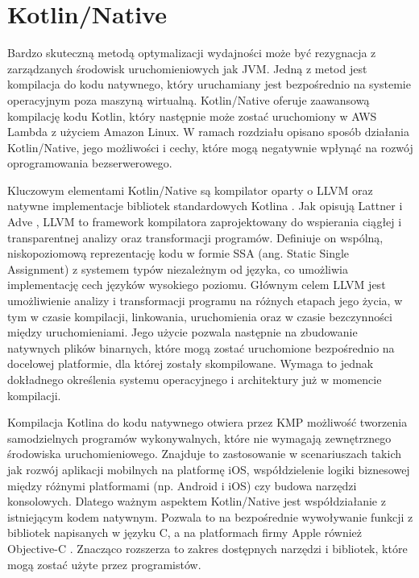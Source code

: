 \section{Kotlin/Native}\label{chapter:kotlin_native}

Bardzo skuteczną metodą optymalizacji wydajności może być rezygnacja z zarządzanych środowisk uruchomieniowych jak JVM.
Jedną z metod jest kompilacja do kodu natywnego, który uruchamiany jest bezpośrednio na systemie operacyjnym poza maszyną wirtualną.
Kotlin/Native oferuje zaawansową kompilację kodu Kotlin, który następnie może zostać uruchomiony w AWS Lambda z użyciem Amazon Linux.
W ramach rozdziału opisano sposób działania Kotlin/Native, jego możliwości i cechy, które mogą negatywnie wpłynąć na rozwój oprogramowania bezserwerowego.

Kluczowym elementami Kotlin/Native są kompilator oparty o LLVM oraz natywne implementacje bibliotek standardowych Kotlina \cite{kotlinlangKotlinDocs}.
Jak opisują Lattner i Adve \cite{1281665}, LLVM to framework kompilatora zaprojektowany do wspierania ciągłej i transparentnej analizy oraz transformacji programów.
Definiuje on wspólną, niskopoziomową reprezentację kodu w formie SSA (ang. Static Single Assignment) z systemem typów niezależnym od języka, co umożliwia implementację cech języków wysokiego poziomu. 
Głównym celem LLVM jest umożliwienie analizy i transformacji programu na różnych etapach jego życia, w tym w czasie kompilacji, linkowania, uruchomienia oraz w czasie bezczynności między uruchomieniami.
Jego użycie pozwala następnie na zbudowanie natywnych plików binarnych, które mogą zostać uruchomione bezpośrednio na docelowej platformie, dla której zostały skompilowane.
Wymaga to jednak dokładnego określenia systemu operacyjnego i architektury już w momencie kompilacji.

Kompilacja Kotlina do kodu natywnego otwiera przez KMP możliwość tworzenia samodzielnych programów wykonywalnych, które nie wymagają zewnętrznego środowiska uruchomieniowego.
Znajduje to zastosowanie w scenariuszach takich jak rozwój aplikacji mobilnych na platformę iOS, współdzielenie logiki biznesowej między różnymi platformami (np. Android i iOS) czy budowa narzędzi konsolowych.
Dlatego ważnym aspektem Kotlin/Native jest współdziałanie z istniejącym kodem natywnym.
Pozwala to na bezpośrednie wywoływanie funkcji z bibliotek napisanych w języku C, a na platformach firmy Apple również Objective-C \cite{kotlinlangKotlinDocs}.
Znacząco rozszerza to zakres dostępnych narzędzi i bibliotek, które mogą zostać użyte przez programistów.

